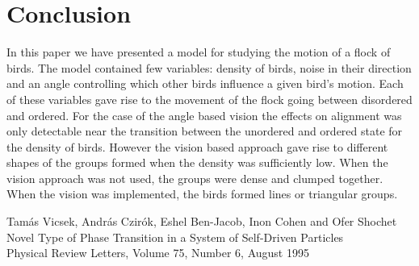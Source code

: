 \documentclass[twoside,twocolumn]{article}
\begin{document}
\section{Conclusion}


In this paper we have presented a model for studying the motion of a flock of birds.
The model contained few variables: density of birds, noise in their direction and an angle
controlling which other birds influence a given bird's motion. Each of these variables gave rise
to the movement of the flock going between disordered and ordered. For the case of the angle based
vision the effects on alignment was only detectable near the transition between the unordered
and ordered state for the density of birds.
However the vision based approach gave rise to different shapes of the groups formed when the density
was sufficiently low. When the vision approach was not used, the groups were dense and clumped
together. When the vision was implemented, the birds formed lines or triangular groups.




\begin{thebibliography}{99} %

  Tamás Vicsek, András Czirók, Eshel Ben-Jacob, Inon Cohen and Ofer Shochet\\
  Novel Type of Phase Transition in a System of Self-Driven Particles\\
  Physical Review Letters, Volume 75, Number 6, August 1995
 
\end{thebibliography}

\end{document}
